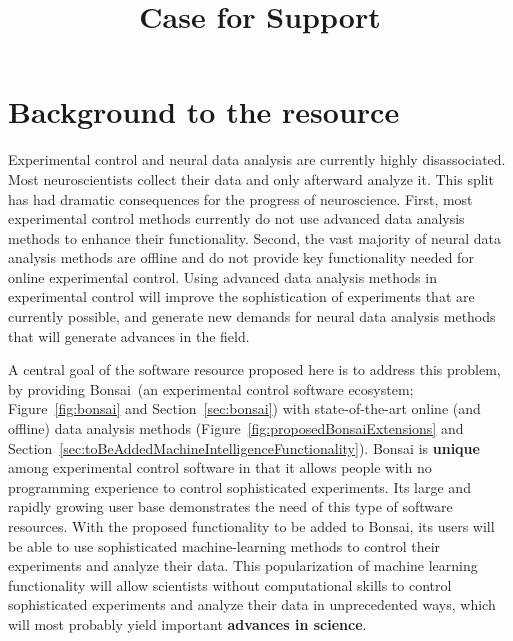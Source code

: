 \documentclass[a4paper,11point]{article}
\title{Case for Support}
\author{}
\begin{document}
\maketitle

\tableofcontents
    
\newpage

\section{Background to the resource}

Experimental control and neural data analysis are currently highly
disassociated.  Most neuroscientists collect their data and only afterward
analyze it. This split has had dramatic consequences for the progress of
neuroscience. First, most experimental control methods currently do not use
advanced data analysis methods to enhance their functionality. Second, the vast
majority of neural data analysis methods are offline and do not provide key
functionality needed for online experimental control. Using advanced data
analysis methods in experimental control will improve the sophistication of
experiments that are currently possible, and generate new demands for neural
data analysis methods that will generate advances in the field.

A central goal of the software resource proposed here is to address this
problem, by providing Bonsai~(an experimental control software ecosystem;
Figure~\ref{fig:bonsai} and Section~\ref{sec:bonsai}) with state-of-the-art
online (and offline) data analysis methods
(Figure~\ref{fig:proposedBonsaiExtensions} and
Section~\ref{sec:toBeAddedMachineIntelligenceFunctionality}). Bonsai is
\textbf{unique} among experimental control software in that it allows people
with no programming experience to control sophisticated experiments. Its large
and rapidly growing user base demonstrates the need of this type of software
resources. With the proposed functionality to be added to Bonsai, its users
will be able to use sophisticated machine-learning methods to control their
experiments and analyze their data. This popularization of machine learning
functionality will allow scientists without computational skills to control
sophisticated experiments and analyze their data in unprecedented ways, which
will most probably yield important \textbf{advances in science}.
\end{document}
